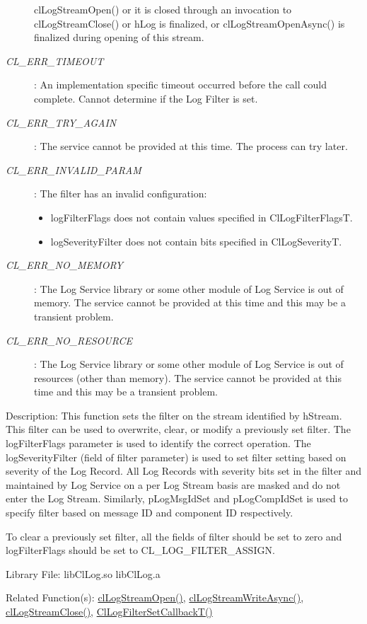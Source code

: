 \begin{flushleft}
\begin{Desc}
\begin{description}
clLogStreamOpen() or it is closed through an invocation to clLogStreamClose() or hLog is finalized, or 
clLogStreamOpenAsync() is finalized during opening of this stream.
\item[{\em CL\_\-ERR\_\-TIMEOUT}]: An implementation specific timeout occurred before the call could complete. Cannot determine if
the Log Filter is set.
\item[{\em CL\_\-ERR\_\-TRY\_\-AGAIN}]: The service cannot be provided at this time. The process can try later.
\item[{\em CL\_\-ERR\_\-INVALID\_\-PARAM}]: The filter has an invalid configuration:
	\begin{itemize}
	\item
	logFilterFlags does not contain values specified in ClLogFilterFlagsT.
	\item
	logSeverityFilter does not contain bits specified in ClLogSeverityT.
	\end{itemize}
\item[{\em CL\_\-ERR\_\-NO\_\-MEMORY}]: The Log Service library or some other module of Log Service is out of memory. The service cannot 
be provided at this time and this may be a transient problem.
\item[{\em CL\_\-ERR\_\-NO\_\-RESOURCE}]: The Log Service library or some other module of Log Service is out of resources 
(other than memory). The service cannot be provided at this time and this may be a transient problem.
\end{description}
\end{Desc}
\begin{Desc}
\item[Description:] This function sets the filter on the stream identified by hStream. This filter can be used to overwrite, clear, or modify a
previously set filter. The logFilterFlags parameter is used to identify the correct operation. The logSeverityFilter (field of filter parameter) is used
to set filter setting based on severity of the Log Record. All Log Records with severity bits set in the filter and maintained by Log Service on a per Log
Stream basis are masked and do not enter the Log Stream. Similarly, pLogMsgIdSet and pLogCompIdSet is used to specify filter based on message ID and 
component ID respectively.
\par
To clear a previously set filter, all the fields of filter should be set to zero and logFilterFlags should be set to CL\_\-LOG\_\-FILTER\_\-ASSIGN.
\end{Desc}
\begin{Desc}
\item[Library File:] libClLog.so
\newline
libClLog.a
\end{Desc}
\begin{Desc}
\item[Related Function(s):]\hyperlink{pagelog106}{clLogStreamOpen()}, \hyperlink{pagelog109}{clLogStreamWriteAsync()},
\hyperlink{pagelog108}{clLogStreamClose()}, \hyperlink{pagelog111}{ClLogFilterSetCallbackT()}\end{Desc}
\newpage




\end{flushleft}
